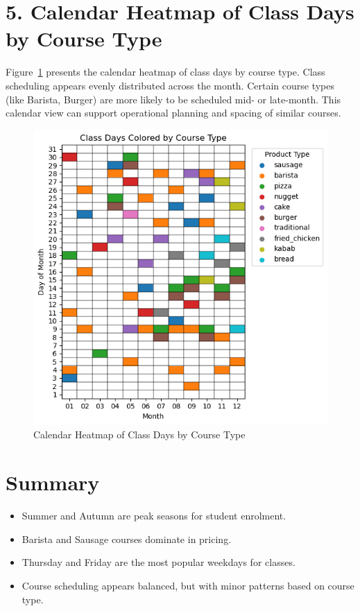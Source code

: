 \documentclass[12pt,a4paper]{article}
\begin{document}
\section*{5. Calendar Heatmap of Class Days by Course Type}

Figure~\ref{fig:calendar-heatmap} presents the calendar heatmap of class days by course type. Class scheduling appears evenly distributed across the month. Certain course types (like Barista, Burger) are more likely to be scheduled mid- or late-month. This calendar view can support operational planning and spacing of similar courses.

\begin{figure}[h!]
    \centering
    \includegraphics[width=1\textwidth]{Class Days Colored by Course Type.png}
    \caption{Calendar Heatmap of Class Days by Course Type}
    \label{fig:calendar-heatmap}
\end{figure}

\section*{Summary}

\begin{itemize}
    \item Summer and Autumn are peak seasons for student enrolment.
    \item Barista and Sausage courses dominate in pricing.
    \item Thursday and Friday are the most popular weekdays for classes.
    \item Course scheduling appears balanced, but with minor patterns based on course type.
\end{itemize}
\end{document}
